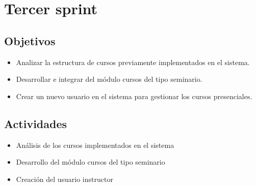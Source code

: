 \section{Tercer sprint} %
\label{sec:tercer_sprint}

\subsection{Objetivos}

\begin{itemize}
	\item Analizar la estructura de cursos previamente implementados en el sistema.
	\item Desarrollar e integrar del módulo cursos del tipo seminario.
	\item Crear un nuevo usuario en el sistema para gestionar los cursos presenciales.
\end{itemize}

\subsection{Actividades} %
\label{sub:actividades3}

\begin{itemize}

\item Análisis de los cursos implementados en el sistema
\item Desarrollo del módulo cursos del tipo seminario
\item Creación del usuario instructor

\end{itemize}



